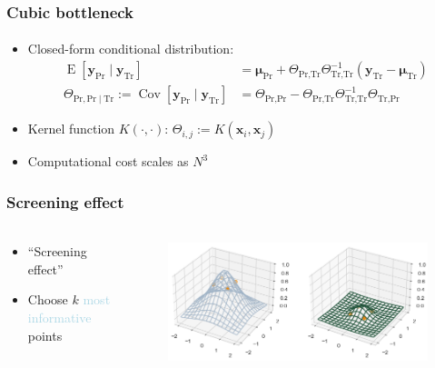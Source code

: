 \documentclass{beamer}                             %
\renewcommand{\vec}[1]{\bm{#1}}
\renewcommand{\vec}[1]{\bm{#1}}
\DeclareMathOperator{\E}{E}
\DeclareMathOperator{\Cov}{Cov}
\begin{document}
\begin{frame}
\frametitle{Cubic bottleneck}
\framesubtitle{}
\begin{itemize}
  \item<+-> Closed-form conditional distribution:
    \begin{align*}
      \E[\vec{y}_\text{Pr} \mid \vec{y}_\text{Tr}] &=
        \vec{\mu}_\text{Pr} +
        \Theta_{\text{Pr}, \text{Tr}} \Theta_{\text{Tr}, \text{Tr}}^{-1}
        (\vec{y}_\text{Tr} - \vec{\mu}_\text{Tr}) \\
      \Theta_{\text{Pr}, \text{Pr} \mid \text{Tr}} :=
      \Cov[\vec{y}_\text{Pr} \mid \vec{y}_\text{Tr}] &=
        \Theta_{\text{Pr}, \text{Pr}} -
        \Theta_{\text{Pr}, \text{Tr}} \Theta_{\text{Tr}, \text{Tr}}^{-1}
        \Theta_{\text{Tr}, \text{Pr}}
    \end{align*}
  \item<+-> Kernel function \( K(\cdot, \cdot) \):
    \( \Theta_{i, j} := K(\vec{x}_i, \vec{x}_j) \)

  \item<+-> Computational cost scales as \( N^3 \)
\end{itemize}
\end{frame}

\begin{frame}
\frametitle{Screening effect}
\framesubtitle{}

\begin{columns}
  \begin{column}{0.6\textwidth}
    \begin{itemize}
      \item<+-> ``Screening effect''
      \item<+-> Choose \( k \) \textcolor{lightblue}{most informative} points
    \end{itemize}
  \end{column}
  \begin{column}{0.4\textwidth}
      \begin{figure}
        \centering
        \includegraphics[width=\textwidth]{kernel2d}
      \end{figure}
  \end{column}
\end{columns}
\end{frame}
\end{document}
